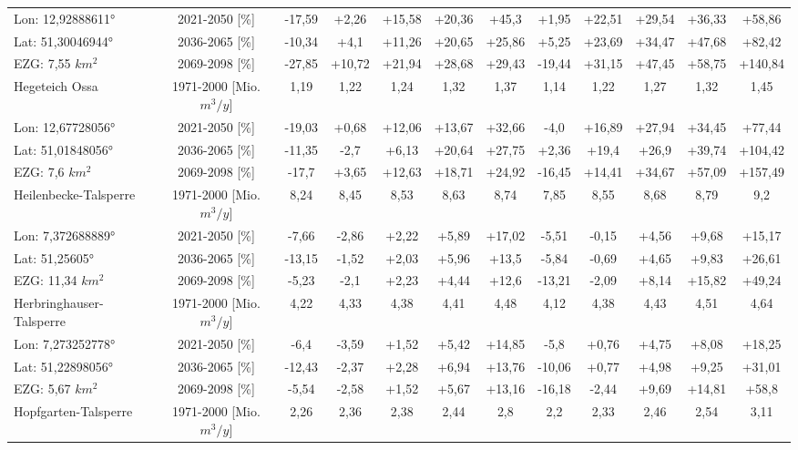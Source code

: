 \begin{longtable}{@{\extracolsep{\fill}}lc|ccccc||ccccc}
\cline{2-12} 
Lon: 12,92888611° & 2021-2050 [\%]  & -17,59 & +2,26 & +15,58 & +20,36 & +45,3 & +1,95 & +22,51 & +29,54 & +36,33 & +58,86\\ 
Lat: 51,30046944° & 2036-2065 [\%]  & -10,34 & +4,1 & +11,26 & +20,65 & +25,86 & +5,25 & +23,69 & +34,47 & +47,68 & +82,42\\ 
EZG: 7,55 $km^2$ & 2069-2098 [\%]  & -27,85 & +10,72 & +21,94 & +28,68 & +29,43 & -19,44 & +31,15 & +47,45 & +58,75 & +140,84\\ 
\hline 
Hegeteich Ossa & 1971-2000 [Mio. $m^3/y$]  & 1,19 & 1,22 & 1,24 & 1,32 & 1,37 & 1,14 & 1,22 & 1,27 & 1,32 & 1,45\\ 
\cline{2-12} 
Lon: 12,67728056° & 2021-2050 [\%]  & -19,03 & +0,68 & +12,06 & +13,67 & +32,66 & -4,0 & +16,89 & +27,94 & +34,45 & +77,44\\ 
Lat: 51,01848056° & 2036-2065 [\%]  & -11,35 & -2,7 & +6,13 & +20,64 & +27,75 & +2,36 & +19,4 & +26,9 & +39,74 & +104,42\\ 
EZG: 7,6 $km^2$ & 2069-2098 [\%]  & -17,7 & +3,65 & +12,63 & +18,71 & +24,92 & -16,45 & +14,41 & +34,67 & +57,09 & +157,49\\ 
\hline 
Heilenbecke-Talsperre & 1971-2000 [Mio. $m^3/y$]  & 8,24 & 8,45 & 8,53 & 8,63 & 8,74 & 7,85 & 8,55 & 8,68 & 8,79 & 9,2\\ 
\cline{2-12} 
Lon: 7,372688889° & 2021-2050 [\%]  & -7,66 & -2,86 & +2,22 & +5,89 & +17,02 & -5,51 & -0,15 & +4,56 & +9,68 & +15,17\\ 
Lat: 51,25605° & 2036-2065 [\%]  & -13,15 & -1,52 & +2,03 & +5,96 & +13,5 & -5,84 & -0,69 & +4,65 & +9,83 & +26,61\\ 
EZG: 11,34 $km^2$ & 2069-2098 [\%]  & -5,23 & -2,1 & +2,23 & +4,44 & +12,6 & -13,21 & -2,09 & +8,14 & +15,82 & +49,24\\ 
\hline 
Herbringhauser-Talsperre & 1971-2000 [Mio. $m^3/y$]  & 4,22 & 4,33 & 4,38 & 4,41 & 4,48 & 4,12 & 4,38 & 4,43 & 4,51 & 4,64\\ 
\cline{2-12} 
Lon: 7,273252778° & 2021-2050 [\%]  & -6,4 & -3,59 & +1,52 & +5,42 & +14,85 & -5,8 & +0,76 & +4,75 & +8,08 & +18,25\\ 
Lat: 51,22898056° & 2036-2065 [\%]  & -12,43 & -2,37 & +2,28 & +6,94 & +13,76 & -10,06 & +0,77 & +4,98 & +9,25 & +31,01\\ 
EZG: 5,67 $km^2$ & 2069-2098 [\%]  & -5,54 & -2,58 & +1,52 & +5,67 & +13,16 & -16,18 & -2,44 & +9,69 & +14,81 & +58,8\\ 
\hline 
Hopfgarten-Talsperre & 1971-2000 [Mio. $m^3/y$]  & 2,26 & 2,36 & 2,38 & 2,44 & 2,8 & 2,2 & 2,33 & 2,46 & 2,54 & 3,11\\ 

\end{longtable}
